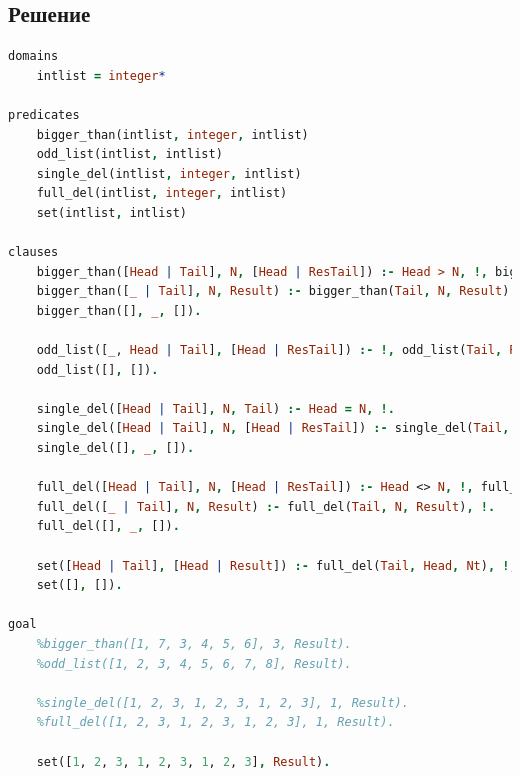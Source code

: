 \documentclass[12pt]{report}
\begin{document}
\subsection*{Решение}
\begin{lstlisting}[language=prolog]
domains
	intlist = integer*

predicates
	bigger_than(intlist, integer, intlist)
	odd_list(intlist, intlist)
	single_del(intlist, integer, intlist)
	full_del(intlist, integer, intlist)
	set(intlist, intlist)

clauses
	bigger_than([Head | Tail], N, [Head | ResTail]) :- Head > N, !, bigger_than(Tail, N, ResTail).
	bigger_than([_ | Tail], N, Result) :- bigger_than(Tail, N, Result).
	bigger_than([], _, []).
	
	odd_list([_, Head | Tail], [Head | ResTail]) :- !, odd_list(Tail, ResTail).
	odd_list([], []).
	
	single_del([Head | Tail], N, Tail) :- Head = N, !.
	single_del([Head | Tail], N, [Head | ResTail]) :- single_del(Tail, N, ResTail), !.
	single_del([], _, []).
	
	full_del([Head | Tail], N, [Head | ResTail]) :- Head <> N, !, full_del(Tail, N, ResTail).
	full_del([_ | Tail], N, Result) :- full_del(Tail, N, Result), !.
	full_del([], _, []).
	
	set([Head | Tail], [Head | Result]) :- full_del(Tail, Head, Nt), !, set(Nt, Result).
	set([], []).

goal
	%bigger_than([1, 7, 3, 4, 5, 6], 3, Result).
	%odd_list([1, 2, 3, 4, 5, 6, 7, 8], Result).
	
	%single_del([1, 2, 3, 1, 2, 3, 1, 2, 3], 1, Result).
	%full_del([1, 2, 3, 1, 2, 3, 1, 2, 3], 1, Result).
	
	set([1, 2, 3, 1, 2, 3, 1, 2, 3], Result).
\end{lstlisting}

	
\end{document}
